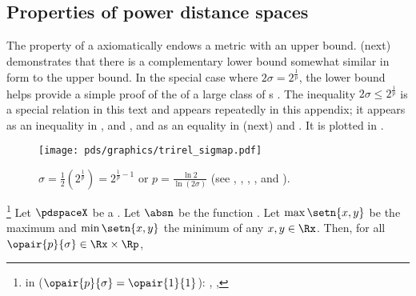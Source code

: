 \subsection{Properties of power distance spaces}
\label{sec:pdspace_propd}
The  property of a 
axiomatically endows a metric with an upper bound.
 (next) demonstrates that there is a complementary lower bound
somewhat similar in form to the  upper bound.
In the special case where $2\sigma=2^\frac{1}{p}$,
the lower bound helps provide a simple proof of the  of
a large class of s .
The inequality $2\sigma\le2^\frac{1}{p}$ is a special relation in this text and appears repeatedly in this appendix;
it appears as an inequality in ,  and ,
and as an equality in  (next) and .
It is plotted in .
\begin{figure}[t]
  \footnotesize%
  \centering%
  \texttt{[image: pds/graphics/trirel\_sigmap.pdf]}
  \caption{$\sigma = \frac{1}{2}(2^{\frac{1}{p}}) = 2^{\frac{1}{p}-1}$ or $p=\frac{\ln2}{\ln(2\sigma)}$
  \label{fig:sigmap}
  \scs(see , , , , and ).
  }
\end{figure}
\begin{lemma}
\footnote{
  in  ($\opair{p}{\sigma}=\opair{1}{1}$):
  ,
  ,
  }
\label{lem:pdspace_ineq}
Let $\pdspaceX$ be a  .
Let $\absn$ be the  function .
Let $\max\setn{x,y}$ be the maximum and $\min\setn{x,y}$ the minimum of any $x,y\in\Rx$.
Then, for all $\opair{p}{\sigma}\in\Rx\times\Rp$,
\end{lemma}
